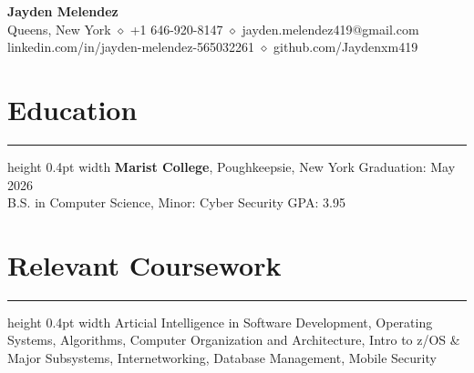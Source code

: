 \documentclass[letterpaper,9pt]{article}
\begin{document}
\pagestyle{empty}

\begin{center}
    {\LARGE \textbf{Jayden Melendez}} \\[2pt]
    Queens, New York \ensuremath{\diamond} +1 646-920-8147 \ensuremath{\diamond} jayden.melendez419@gmail.com \\[1pt]
    linkedin.com/in/jayden-melendez-565032261 \ensuremath{\diamond} github.com/Jaydenxm419
\end{center}

\vspace{-4pt}

\section*{Education}
\hrule height 0.4pt width \textwidth \vspace{2pt}
\textbf{Marist College}, Poughkeepsie, New York \hfill Graduation: May 2026 \\
B.S. in Computer Science, Minor: Cyber Security \hfill GPA: 3.95

\section*{Relevant Coursework}
\hrule height 0.4pt width \textwidth \vspace{2pt}
Articial Intelligence in Software Development, Operating Systems, Algorithms, Computer Organization and Architecture, Intro to z/OS \& Major Subsystems, Internetworking, Database Management, Mobile Security
\end{document}
